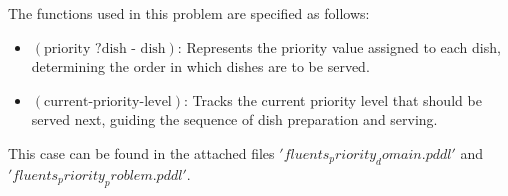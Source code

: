 The functions used in this problem are specified as follows:
\begin{itemize}
  \item $ (\text{priority } ?\text{dish - dish}) $: Represents the priority value assigned to each dish, determining the order in which dishes are to be served.
  \item $ (\text{current-priority-level}) $: Tracks the current priority level that should be served next, guiding the sequence of dish preparation and serving.
\end{itemize}

This case can be found in the attached files $'fluents_priority_domain.pddl'$ and $'fluents_priority_problem.pddl'$.